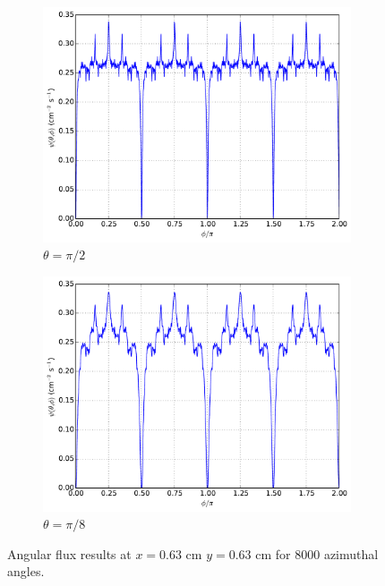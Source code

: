 \documentclass[12pt]{article}
\newenvironment{solution}[1][Solution]{\begin{trivlist}
\item[\hskip \labelsep {\bfseries #1} {\hspace{-0.2em}\bfseries:}]\hspace{0.3in}\newline}{\end{trivlist}}
\begin{document}
\begin{solution}
\begin{figure}
    \begin{subfigure}{0.5\textwidth}
\centering
\includegraphics[width=1.0\textwidth]{r6363pi2.pdf}
\caption{$\theta=\pi/2$}
    \end{subfigure}
    \begin{subfigure}{0.5\textwidth}
\centering
\includegraphics[width=1.0\textwidth]{r6363pi8.pdf}
\caption{$\theta=\pi/8$}
    \end{subfigure}
    \caption{Angular flux results at $x=0.63$ cm $y=0.63$ cm for 8000 azimuthal angles.}
\end{figure}
\begin{figure}
    \begin{subfigure}{0.5\textwidth}

\end{subfigure}
\end{figure}
\end{solution}
\end{document}
